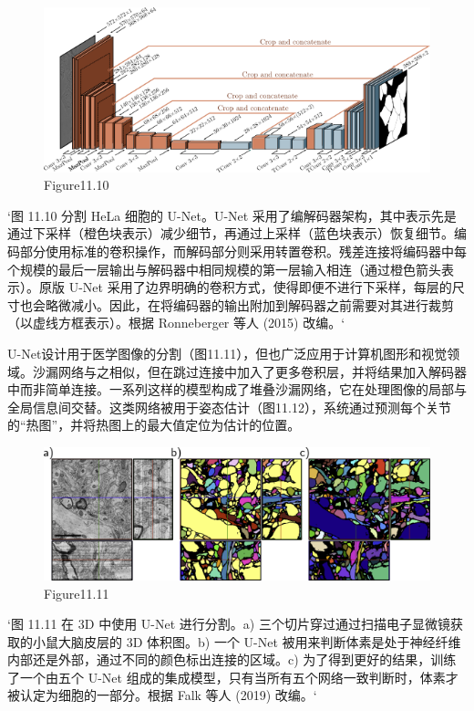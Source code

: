 \begin{figure}[h!]
\centering
\includegraphics[width=0.7\linewidth]{png/chapter11/ResidualUNet.png}
\caption{Figure11.10}
\end{figure}

`图 11.10 分割 HeLa 细胞的 U-Net。U-Net 采用了编解码器架构，其中表示先是通过下采样（橙色块表示）减少细节，再通过上采样（蓝色块表示）恢复细节。编码部分使用标准的卷积操作，而解码部分则采用转置卷积。残差连接将编码器中每个规模的最后一层输出与解码器中相同规模的第一层输入相连（通过橙色箭头表示）。原版 U-Net 采用了边界明确的卷积方式，使得即便不进行下采样，每层的尺寸也会略微减小。因此，在将编码器的输出附加到解码器之前需要对其进行裁剪（以虚线方框表示）。根据 Ronneberger 等人 (2015) 改编。`

U-Net设计用于医学图像的分割（图11.11），但也广泛应用于计算机图形和视觉领域。沙漏网络与之相似，但在跳过连接中加入了更多卷积层，并将结果加入解码器中而非简单连接。一系列这样的模型构成了堆叠沙漏网络，它在处理图像的局部与全局信息间交替。这类网络被用于姿态估计（图11.12），系统通过预测每个关节的“热图”，并将热图上的最大值定位为估计的位置。

\begin{figure}[h!]
\centering
\includegraphics[width=0.7\linewidth]{png/chapter11/ResidualUNetResults.png}
\caption{Figure11.11}
\end{figure}

`图 11.11 在 3D 中使用 U-Net 进行分割。a) 三个切片穿过通过扫描电子显微镜获取的小鼠大脑皮层的 3D 体积图。b) 一个 U-Net 被用来判断体素是处于神经纤维内部还是外部，通过不同的颜色标出连接的区域。c) 为了得到更好的结果，训练了一个由五个 U-Net 组成的集成模型，只有当所有五个网络一致判断时，体素才被认定为细胞的一部分。根据 Falk 等人 (2019) 改编。`

